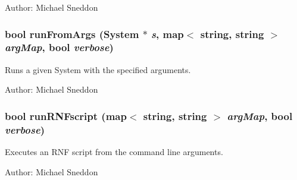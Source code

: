 \begin{Desc}
\item[Author:]Michael Sneddon \end{Desc}
\subsubsection{\setlength{\rightskip}{0pt plus 5cm}bool runFromArgs ({\bf System} $\ast$ {\em s}, map$<$ string, string $>$ {\em argMap}, bool {\em verbose})}\label{NFsim_8cpp_1df3932ce2db1db1f6c546529a162aa2}


Runs a given System with the specified arguments. 

\begin{Desc}
\item[Author:]Michael Sneddon \end{Desc}
\subsubsection{\setlength{\rightskip}{0pt plus 5cm}bool runRNFscript (map$<$ string, string $>$ {\em argMap}, bool {\em verbose})}\label{NFsim_8cpp_845f3f1c09965a9e54010b0f0c4c84f2}


Executes an RNF script from the command line arguments. 

\begin{Desc}
\item[Author:]Michael Sneddon \end{Desc}
